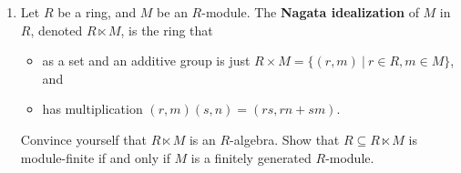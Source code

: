 \documentclass[12pt]{amsart}
\newcommand\itemB{\stepcounter{enumi}\item[(\theenumi)]}
\begin{document}
\begin{enumerate}
\itemB Let $R$ be a ring, and $M$ be an $R$-module. The \textbf{Nagata idealization} of $M$ in $R$, denoted $R\ltimes M$, is the ring that
\begin{itemize}
\item as a set and an additive group is just $R\times M = \{ (r,m) \ | \ r\in R, m\in M\}$, and
\item has multiplication $(r,m)(s,n) = (rs, rn+sm)$.
\end{itemize}
Convince yourself that $R\ltimes M$ is an $R$-algebra. Show that $R\subseteq R\ltimes M$ is module-finite if and only if $M$ is a finitely generated $R$-module.




\end{enumerate}
\end{document}
